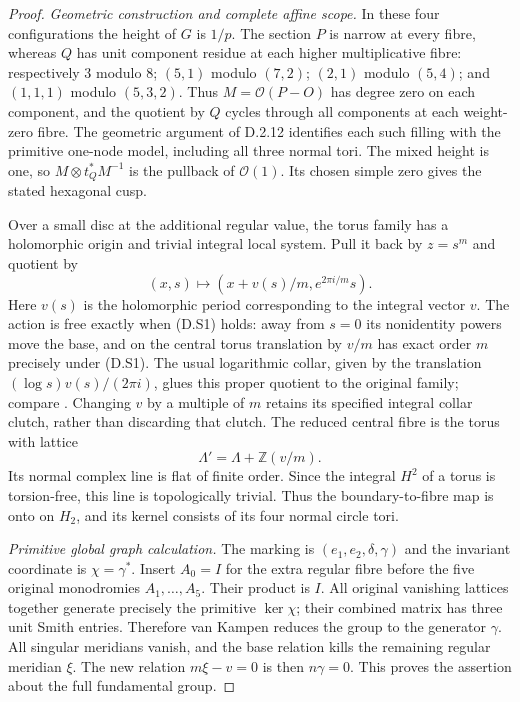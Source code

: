 \begin{proof}
\emph{Geometric construction and complete affine scope.}
In these four configurations the height of $G$ is $1/p$.
The section $P$ is narrow at every fibre, whereas $Q$ has
unit component residue at each higher multiplicative fibre:
respectively $3$ modulo $8$; $(5,1)$ modulo $(7,2)$;
$(2,1)$ modulo $(5,4)$; and $(1,1,1)$ modulo $(5,3,2)$.
Thus $M=\mathcal O(P-O)$ has degree zero on each component,
and the quotient by $Q$ cycles through all components at each
weight-zero fibre. The geometric argument of D.2.12 identifies
each such filling with the primitive one-node model, including
all three normal tori. The mixed height is one, so
$M\otimes t_Q^*M^{-1}$ is the pullback of $\mathcal O(1)$.
Its chosen simple zero gives the stated hexagonal cusp.

Over a small disc at the additional regular value, the torus
family has a holomorphic origin and trivial integral local
system. Pull it back by $z=s^m$ and quotient by
\[
 (x,s)\longmapsto (x+v(s)/m,e^{2\pi i/m}s).
\]
Here $v(s)$ is the holomorphic period corresponding to the
integral vector $v$. The action is free exactly when (D.S1)
holds: away from $s=0$ its nonidentity powers move the base,
and on the central torus translation by $v/m$ has exact
order $m$ precisely under (D.S1). The usual logarithmic
collar, given by the translation
$(\log s)v(s)/(2\pi i)$, glues this proper quotient to the
original family; compare \cite[Proposition 2.3]{manViaclovskyLogs26}.
Changing $v$ by a multiple of $m$ retains its specified
integral collar clutch, rather than discarding that clutch.
The reduced central fibre is the torus with lattice
\[
 \Lambda'=\Lambda+\mathbb Z(v/m).
 \tag{D.S5}
\]
Its normal complex line is flat of finite order. Since the
integral $H^2$ of a torus is torsion-free, this line is
topologically trivial. Thus the boundary-to-fibre map is
onto on $H_2$, and its kernel consists of its four normal
circle tori.

\emph{Primitive global graph calculation.}
The marking is $(e_1,e_2,\delta,\gamma)$ and the invariant
coordinate is $\chi=\gamma^*$. Insert $A_0=I$ for the extra
regular fibre before the five original monodromies
$A_1,\ldots,A_5$. Their product is $I$.
All original vanishing lattices together generate precisely
the primitive $\ker\chi$; their combined matrix has three
unit Smith entries. Therefore van Kampen reduces the group
to the generator $\gamma$. All singular meridians vanish,
and the base relation kills the remaining regular meridian
$\xi$. The new relation $m\xi-v=0$ is then $n\gamma=0$.
This proves the assertion about the full fundamental group.


\end{proof}
